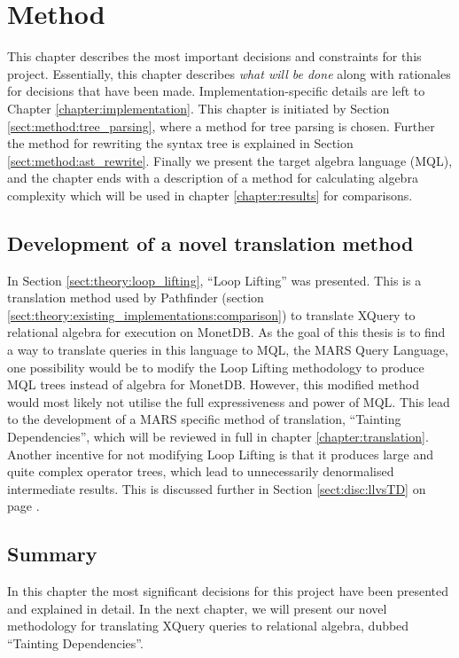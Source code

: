 \chapter{Method}
\label{chapter:method}
This chapter describes the most important decisions and constraints for this
project. Essentially, this chapter describes \emph{what will be done} along
with rationales for decisions that have been made. Implementation-specific
details are left to Chapter \ref{chapter:implementation}. This chapter is
initiated by Section \ref{sect:method:tree_parsing}, where a method for tree
parsing is chosen. Further the method for rewriting the syntax tree is
explained in Section \ref{sect:method:ast_rewrite}. Finally we present the
target algebra language (MQL), and the chapter ends with a description of a
method for calculating algebra complexity which will be used in chapter
\ref{chapter:results} for comparisons.

\section{Development of a novel translation method}

In Section \ref{sect:theory:loop_lifting}, ``Loop Lifting'' was presented. This
is a translation method used by Pathfinder (section
\ref{sect:theory:existing_implementations:comparison}) to translate XQuery to
relational algebra for execution on MonetDB. As the goal of this thesis is to
find a way to translate queries in this language to MQL, the MARS Query
Language, one possibility would be to modify the Loop Lifting methodology to
produce MQL trees instead of algebra for MonetDB. However, this modified
method would most likely not utilise the full expressiveness and power of MQL.
This lead to the development of a MARS specific method of translation,
``Tainting Dependencies'', which will be reviewed in full in chapter
\ref{chapter:translation}. Another incentive for not modifying Loop Lifting is
that it produces large and quite complex operator trees, which lead to
unnecessarily denormalised intermediate results. This is discussed further in
Section \ref{sect:disc:llvsTD} on page \pageref{sect:disc:llvsTD}.







\section{Summary}
\label{sect:method:summary}
In this chapter the most significant decisions for this project have been
presented and explained in detail. In the next chapter, we will present our
novel methodology for translating XQuery queries to relational algebra, dubbed
``Tainting Dependencies''.
